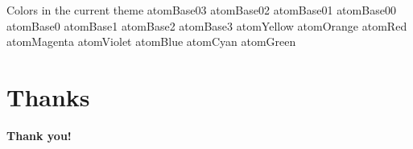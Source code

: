\documentclass[aspectratio=169]{beamer}
\begin{document}
\begin{frame}{Colors in the current theme}
  \colorbox{atomBase03} {\color{white}atomBase03}
  \colorbox{atomBase02} {\color{white}atomBase02}
  \colorbox{atomBase01} {\color{white}atomBase01}
  \colorbox{atomBase00} {\color{white}atomBase00}
  \colorbox{atomBase0}  {\color{white}atomBase0}
  \colorbox{atomBase1}  {\color{white}atomBase1}
  \colorbox{atomBase2}  {\color{white}atomBase2}
  \colorbox{atomBase3}  {\color{white}atomBase3}
  \colorbox{atomYellow} {\color{white}atomYellow}
  \colorbox{atomOrange} {\color{white}atomOrange}
  \colorbox{atomRed}    {\color{white}atomRed}
  \colorbox{atomMagenta}{\color{white}atomMagenta}
  \colorbox{atomViolet} {\color{white}atomViolet}
  \colorbox{atomBlue}   {\color{white}atomBlue}
  \colorbox{atomCyan}   {\color{white}atomCyan}
  \colorbox{atomGreen}  {\color{white}atomGreen}
\end{frame}



\section*{Thanks}

\begin{frame}
    \vspace*{1cm}
    \begin{center}
      {\Huge \bf \textcolor{atomAccent}{Thank you!}}
    \end{center}
\end{frame}

%

\end{document}

